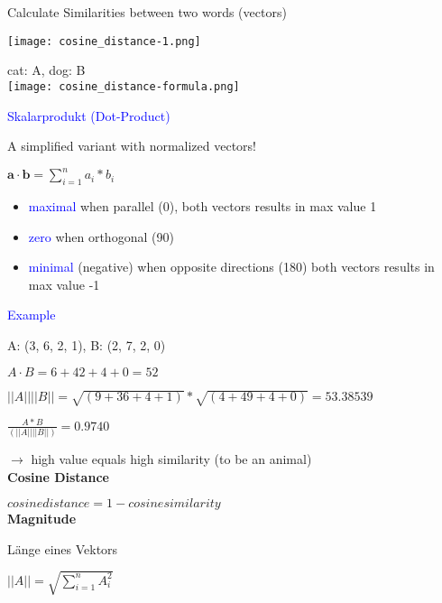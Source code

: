 Calculate Similarities between two words (vectors)

\begin{minipage}[t]{0.4\linewidth}
    \vspace{0pt}
    \texttt{[image: cosine\_distance-1.png]}
\end{minipage}
\begin{minipage}[t]{0.6\linewidth}
    cat: A, dog: B \\

    \texttt{[image: cosine\_distance-formula.png]}
\end{minipage}
\vspace{10pt}
\textcolor{blue}{Skalarprodukt (Dot-Product)}

A simplified variant with normalized vectors!

$\mathbf{a} \cdot \mathbf{b} = \sum_{i=1}^n a_i * b_i$ \\

\begin{itemize}
    \item \textcolor{blue}{maximal} when parallel (0\textdegree), both vectors results in max value 1
    \item \textcolor{blue}{zero} when orthogonal (90\textdegree)
    \item \textcolor{blue}{minimal} (negative) when opposite directions (180\textdegree) both vectors results in max value -1
\end{itemize}
\vspace{10pt}



\textcolor{blue}{Example}

A: (3, 6, 2, 1), B: (2, 7, 2, 0)

$A \cdot B = 6 + 42 + 4 + 0 = 52$

$|| A || || B || = \sqrt{(9 + 36 + 4 + 1)} * \sqrt{(4 + 49 + 4 + 0)} = 53.38539$

$\frac{A * B}{( || A || || B ||)} = 0.9740$

$\rightarrow$ high value equals high similarity (to be an animal) \\

\textbf{Cosine Distance}

$cosine distance = 1 - cosine similarity$ \\

\textbf{Magnitude}

Länge eines Vektors

$||A|| = \sqrt{\sum_{i=1}^n A^{2}_i}$
